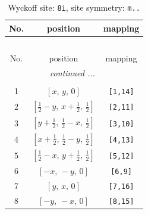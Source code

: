 \documentclass[fleqn,8pt]{jsarticle}
\begin{document}
\renewcommand{\arraystretch}{1.2}
\begin{longtable}{ccc}
\caption{Wyckoff site: {\tt 8i}, site symmetry: {\tt m..}}
 \\
 \hline \hline
No. & position & mapping \\ \hline \endfirsthead

\multicolumn{2}{l}{\tablename\ \thetable{}} \\
 \hline \hline
No. & position & mapping \\ \hline \endhead

 \hline \hline
\multicolumn{2}{r}{\footnotesize\it continued ...} \\ \endfoot

 \hline \hline
\multicolumn{2}{r}{} \\ \endlastfoot

1 & $\left[ x,\, y,\, 0 \right]$ & {\tt [1,14]} \\ \hline
2 & $\left[ \frac{1}{2} - y,\, x + \frac{1}{2},\, \frac{1}{2} \right]$ & {\tt [2,11]} \\ \hline
3 & $\left[ y + \frac{1}{2},\, \frac{1}{2} - x,\, \frac{1}{2} \right]$ & {\tt [3,10]} \\ \hline
4 & $\left[ x + \frac{1}{2},\, \frac{1}{2} - y,\, \frac{1}{2} \right]$ & {\tt [4,13]} \\ \hline
5 & $\left[ \frac{1}{2} - x,\, y + \frac{1}{2},\, \frac{1}{2} \right]$ & {\tt [5,12]} \\ \hline
6 & $\left[ - x,\, - y,\, 0 \right]$ & {\tt [6,9]} \\ \hline
7 & $\left[ y,\, x,\, 0 \right]$ & {\tt [7,16]} \\ \hline
8 & $\left[ - y,\, - x,\, 0 \right]$ & {\tt [8,15]} \\
\end{longtable}
\renewcommand{\arraystretch}{1.2}
\end{document}
